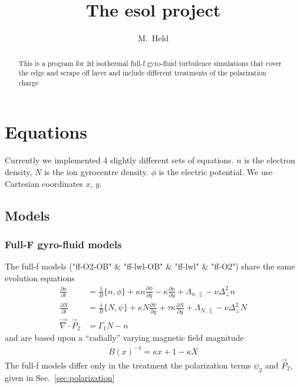 


\usepackage{minted}



\title{The esol project}
\author{M.~Held}
\maketitle

\begin{abstract}
  This is a program for 2d isothermal full-f gyro-fluid turbulence simulations 
that cover the edge and scrape off layer and include different treatments of the 
polarization charge
\end{abstract}

\section{Equations}
Currently we implemented $4$ slightly different sets of equations. $n$ is the 
electron density, $N$ is the ion gyrocentre density. $\phi$ is the electric 
potential. We
use Cartesian coordinates $x$, $y$.
\subsection{Models}
\subsubsection{Full-F gyro-fluid models}
The full-f models ("ff-O2-OB" \& "ff-lwl-OB" \& "ff-lwl" \& "ff-O2") share the 
same evolution equations
\begin{subequations}
\begin{align}
 \frac{\partial n}{\partial t}     &= 
    \frac{1}{B}\{ n, \phi\} 
  + \kappa n\frac{\partial \phi}{\partial y} 
  -\kappa \frac{\partial n}{\partial y} + \Lambda_{n,\parallel}
  - \nu \Delta_\perp^2 n  \\
  \frac{\partial N}{\partial t} &=
  \frac{1}{B}\{ N, \psi\} 
  + \kappa N\frac{\partial \psi}{\partial y} 
  + \tau \kappa\frac{\partial N}{\partial y} + \Lambda_{N,\parallel}-\nu 
\Delta_\perp^2 N \\
   \vec{\nabla}\cdot \vec{P}_2 &= \Gamma_1 N-n
\end{align}
\end{subequations}
and are based upon a ``radially'' varying magnetic field magnitude
\begin{align}
 B(x)^{-1} = \kappa x +1-\kappa X 
\end{align}
The full-f models differ only in the treatment the  polarization terms 
\(\psi_2\) and \(\vec{P}_2\), given in Sec.~\ref{sec:polarization}
